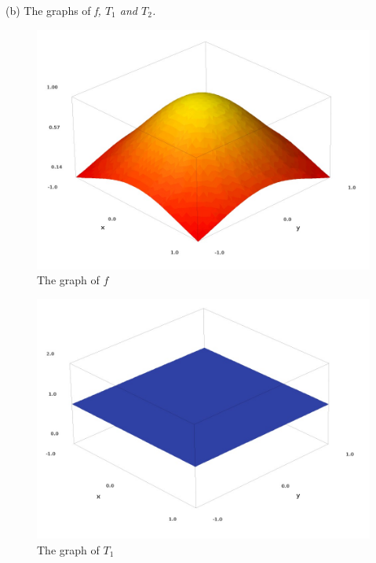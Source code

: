 \documentclass[a4paper,12pt]{article}
\begin{document}
\clearpage
(b)
The graphs of \em{f}, \em{$T_{1}$} and \em{$T_{2}$}.
\begin{figure}[H]
    \centering
    \includegraphics[scale=0.33]{2_f.jpg}
    \caption{The graph of $f$}
    \label{2_f}
\end{figure}
\begin{figure}[H]
    \centering
    \includegraphics[scale=0.33]{2_t1.jpg}
    \caption{The graph of $T_{1}$}
    \label{2_t1}
\end{figure}
\end{document}
